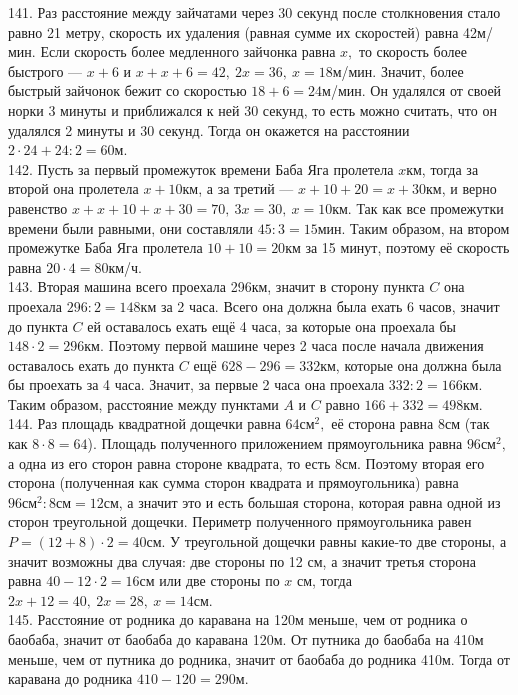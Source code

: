 141. Раз расстояние между зайчатами через 30 секунд после столкновения стало равно 21 метру, скорость их удаления (равная сумме их скоростей) равна 42м/мин. Если скорость более медленного зайчонка равна $x,$ то скорость более быстрого --- $x+6$ и $x+x+6=42,\ 2x=36,\ x=18$м/мин. Значит, более быстрый зайчонок бежит со скоростью $18+6=24$м/мин. Он удалялся от своей норки 3 минуты и приближался к ней 30 секунд, то есть можно считать, что он удалялся 2 минуты и 30 секунд. Тогда он окажется на расстоянии $2\cdot24+24:2=60$м.\\
142. Пусть за первый промежуток времени Баба Яга пролетела $x$км, тогда за второй она пролетела $x+10$км, а за третий --- $x+10+20=x+30$км, и верно равенство $x+x+10+x+30=70,\ 3x=30,\ x=10$км. Так как все промежутки времени были равными, они составляли $45:3=15$мин. Таким образом, на втором промежутке Баба Яга пролетела $10+10=20$км за 15 минут, поэтому её скорость равна $20\cdot4=80$км/ч.\\
143. Вторая машина всего проехала 296км, значит в сторону пункта $C$ она проехала $296:2=148$км за 2 часа. Всего она должна была ехать 6 часов, значит до пункта $C$ ей оставалось ехать ещё 4 часа, за которые она проехала бы $148\cdot2=296$км. Поэтому первой машине через 2 часа после начала движения оставалось ехать до пункта $C$ ещё $628-296=332$км, которые она должна была бы проехать за 4 часа. Значит, за первые 2 часа она проехала $332:2=166$км. Таким образом, расстояние между пунктами $A$ и $C$ равно $166+332=498$км.\\
144. Раз площадь квадратной дощечки равна $64\text{см}^2,$ её сторона равна 8см (так как $8\cdot8=64$). Площадь полученного приложением прямоугольника равна $96\text{см}^2,$ а одна из его сторон равна стороне квадрата, то есть 8см. Поэтому вторая его сторона (полученная как сумма сторон квадрата и прямоугольника) равна $96\text{см}^2:8\text{см}=12$см, а значит это и есть большая сторона, которая равна одной из сторон треугольной дощечки. Периметр полученного прямоугольника равен $P=(12+8)\cdot2=40$см. У треугольной дощечки равны какие-то две стороны, а значит возможны два случая: две стороны по 12 см, а значит третья сторона равна $40-12\cdot2=16$см или две стороны по $x$ см, тогда $2x+12=40,\ 2x=28,\ x=14$см.\\
145. Расстояние от родника до каравана на 120м меньше, чем от родника о баобаба, значит от баобаба до каравана 120м. От путника до баобаба на 410м меньше, чем от путника до родника, значит от баобаба до родника 410м. Тогда от каравана до родника $410-120=290$м.\\
